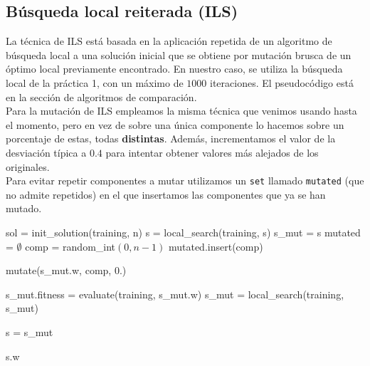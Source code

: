 \documentclass[12pt]{article}
\begin{document}
\subsection*{Búsqueda local reiterada (ILS)}
\label{bl}

La técnica de ILS está basada en la aplicación repetida de un algoritmo de búsqueda local a una solución inicial que se obtiene por mutación brusca de un óptimo local previamente encontrado. En nuestro caso, se utiliza la búsqueda local de la práctica 1, con un máximo de $1000$ iteraciones. El pseudocódigo está en la sección de algoritmos de comparación.\\

Para la mutación de ILS empleamos la misma técnica que venimos usando hasta el momento, pero en vez de sobre una única componente lo hacemos sobre un porcentaje de estas, todas \textbf{distintas}. Además, incrementamos el valor de la desviación típica a $0.4$ para intentar obtener valores más alejados de los originales.\\

Para evitar repetir componentes a mutar utilizamos un \verb|set| llamado \verb|mutated| (que no admite repetidos) en el que insertamos las componentes que ya se han mutado.\\

\begin{algorithm}[h!]
\begin{algorithmic}


\State sol = init\_solution(training, n)  
\State s = local\_search(training, s)
  
    \State s\_mut = s
    \State mutated = $\emptyset$
      
            \State comp = random\_int$(0, n-1)$
            \State mutated.insert(comp)
        \EndWhile
        
        \State mutate(s\_mut.w, comp, $0.$)
    \EndFor
    
    \State s\_mut.fitness = evaluate(training, s\_mut.w)
    \State s\_mut = local\_search(training, s\_mut)  
    
      
        \State s = s\_mut
    \EndIf
\EndFor

\State \Return s.w

\EndFunction
\end{algorithmic}
\end{algorithm}
\end{document}
